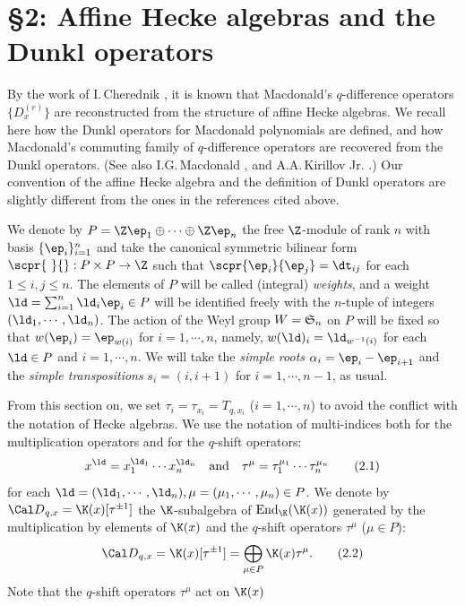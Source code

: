 \section{\S2: Affine Hecke algebras and the Dunkl operators}
By the work of I.\,Cherednik \cite{C}, 
it is known that Macdonald's $q$-difference operators $\{D_x^{(r)}\}$ 
are reconstructed from the structure of affine Hecke algebras. 
We recall here how the Dunkl operators for Macdonald polynomials are 
defined, and how Macdonald's commuting family of $q$-difference operators 
are recovered from the Dunkl operators.  (See also I.G.\,Macdonald \cite{Ma2}, 
and A.A.\,Kirillov Jr. \cite{KJr}.) 
Our convention of the affine Hecke algebra and the definition of 
Dunkl operators are slightly different from the ones in the references 
cited above. 
\par\smallpagebreak\par
We denote by $P=\Z\ep_1\oplus\cdots\oplus\Z\ep_n$ the free $\Z$-module 
of rank $n$ with basis $\{\ep_i\}_{i=1}^n$
and take the canonical symmetric bilinear form 
$\scpr{\ }{}:P\times P \to \Z$ such that $\scpr{\ep_i}{\ep_j}=\dt_{ij}$
for each $1\le i,j\le n$.  
The elements of $P$ will be called (integral) {\it weights}, 
and a weight $\ld=\sum_{i=1}^n\ld_i\ep_i \in P$ will be 
identified freely with the $n$-tuple of integers 
$(\ld_1,\cdots,\ld_n)$.  
The action of the Weyl group $W=\frak{S}_n$ on $P$ will be fixed 
so that $w(\ep_i)=\ep_{w(i)}$ for $i=1,\cdots,n$,  
namely,  $w(\ld)_i=\ld_{w^{-1}(i)}$ for each $\ld\in P$ and 
$i=1,\cdots,n$. 
We will take the 
{\it simple roots} $\alpha_i=\ep_i-\ep_{i+1}$ and the 
{\it simple transpositions} $s_i=(i,i+1)$  for $i=1,\cdots,n-1$,
as usual. 
\par 
{}From this section on, we set $\tau_i=\tau_{x_i}=T_{q,x_i}$ ($i=1,\cdots,n$) 
to avoid the conflict with the notation of Hecke algebras. 
We use the notation of multi-indices both for the multiplication 
operators and for the $q$-shift operators: 
$$ 
x^\ld=x_1^{\ld_1}\cdots x_n^{\ld_n}\quad \text{and}\quad
\tau^\mu=\tau_1^{\mu_1}\cdots\tau_n^{\mu_n}
\tag{2.1}
$$ 
for each $\ld=(\ld_1,\cdots,\ld_n),\mu=(\mu_1,\cdots,\mu_n)\in P$. 
We denote by ${\Cal D}_{q,x}=\K(x)[\tau^{\pm 1}]$ the 
$\K$-subalgebra of $\operatorname{End}_\K(\K(x))$ generated by 
the multiplication by elements of $\K(x)$ and
the $q$-shift operators $\tau^\mu$ ($\mu\in P$): 
$$
{\Cal D}_{q,x}=\K(x)[\tau^{\pm 1}]=\bigoplus_{\mu\in P}\K(x) \tau^\mu.
\tag{2.2}
$$ 
Note that the $q$-shift operators $\tau^\mu$ act on $\K(x)$ 
